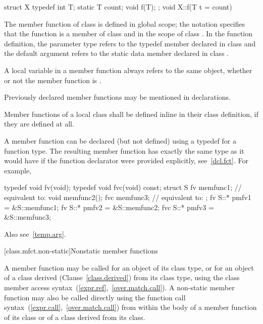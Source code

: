 \begin{codeblock}
struct X {
  typedef int T;
  static T count;
  void f(T);
};
void X::f(T t = count) { }
\end{codeblock}

The member function  of class  is defined in global
scope; the notation  specifies that the function 
is a member of class  and in the scope of class . In
the function definition, the parameter type  refers to the
typedef member  declared in class  and the default
argument  refers to the static data member 
declared in class .
\exitexample

\pnum
A  local variable in a member function always refers to
the same object, whether or not the member function is .

\pnum
Previously declared member functions may be mentioned in  declarations.

\pnum
{}%
Member functions of a local class shall be defined inline in their class
definition, if they are defined at all.

\pnum
\enternote
A member function can be declared (but not defined) using a typedef for
a function type. The resulting member function has exactly the same type
as it would have if the function declarator were provided explicitly,
see~\ref{dcl.fct}. For example,

\begin{codeblock}
typedef void fv(void);
typedef void fvc(void) const;
struct S {
  fv memfunc1;      // equivalent to: 
  void memfunc2();
  fvc memfunc3;     // equivalent to: 
};
fv  S::* pmfv1 = &S::memfunc1;
fv  S::* pmfv2 = &S::memfunc2;
fvc S::* pmfv3 = &S::memfunc3;
\end{codeblock}

Also see~\ref{temp.arg}.
\exitnote

[class.mfct.non-static]{Nonstatic member functions}%

\pnum
A  member function may be called for an object of
its class type, or for an object of a class derived
(Clause~\ref{class.derived}) from its class type, using the class member
access syntax~(\ref{expr.ref},~\ref{over.match.call}). A non-static
member function may also be called directly using the function call
syntax~(\ref{expr.call},~\ref{over.match.call}) from within
the body of a member function of its class or of a class derived from
its class.

